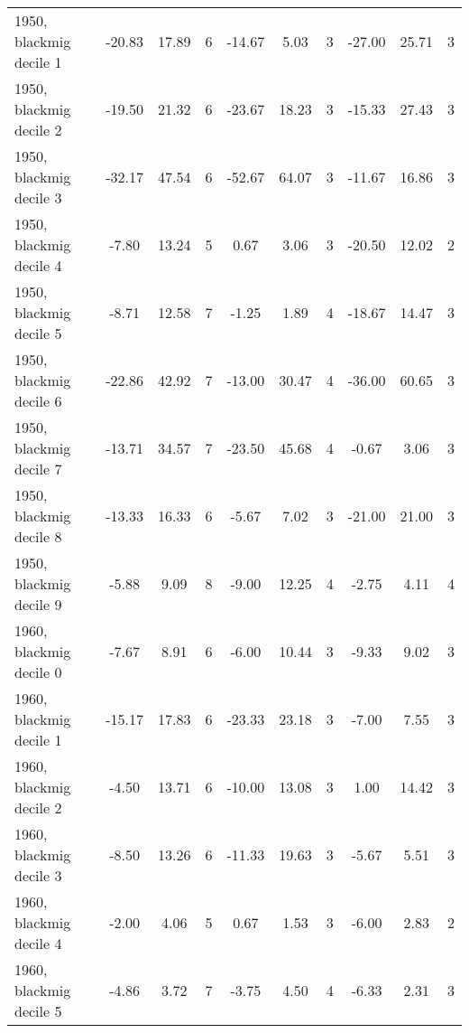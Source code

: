 \begin{table}[htbp]
\begin{tabular}{l*{3}{ccc}}
1950, blackmig decile 1&      -20.83&       17.89&           6&      -14.67&        5.03&           3&      -27.00&       25.71&           3\\
1950, blackmig decile 2&      -19.50&       21.32&           6&      -23.67&       18.23&           3&      -15.33&       27.43&           3\\
1950, blackmig decile 3&      -32.17&       47.54&           6&      -52.67&       64.07&           3&      -11.67&       16.86&           3\\
1950, blackmig decile 4&       -7.80&       13.24&           5&        0.67&        3.06&           3&      -20.50&       12.02&           2\\
1950, blackmig decile 5&       -8.71&       12.58&           7&       -1.25&        1.89&           4&      -18.67&       14.47&           3\\
1950, blackmig decile 6&      -22.86&       42.92&           7&      -13.00&       30.47&           4&      -36.00&       60.65&           3\\
1950, blackmig decile 7&      -13.71&       34.57&           7&      -23.50&       45.68&           4&       -0.67&        3.06&           3\\
1950, blackmig decile 8&      -13.33&       16.33&           6&       -5.67&        7.02&           3&      -21.00&       21.00&           3\\
1950, blackmig decile 9&       -5.88&        9.09&           8&       -9.00&       12.25&           4&       -2.75&        4.11&           4\\
1960, blackmig decile 0&       -7.67&        8.91&           6&       -6.00&       10.44&           3&       -9.33&        9.02&           3\\
1960, blackmig decile 1&      -15.17&       17.83&           6&      -23.33&       23.18&           3&       -7.00&        7.55&           3\\
1960, blackmig decile 2&       -4.50&       13.71&           6&      -10.00&       13.08&           3&        1.00&       14.42&           3\\
1960, blackmig decile 3&       -8.50&       13.26&           6&      -11.33&       19.63&           3&       -5.67&        5.51&           3\\
1960, blackmig decile 4&       -2.00&        4.06&           5&        0.67&        1.53&           3&       -6.00&        2.83&           2\\
1960, blackmig decile 5&       -4.86&        3.72&           7&       -3.75&        4.50&           4&       -6.33&        2.31&           3\\

\end{tabular}
\end{table}
